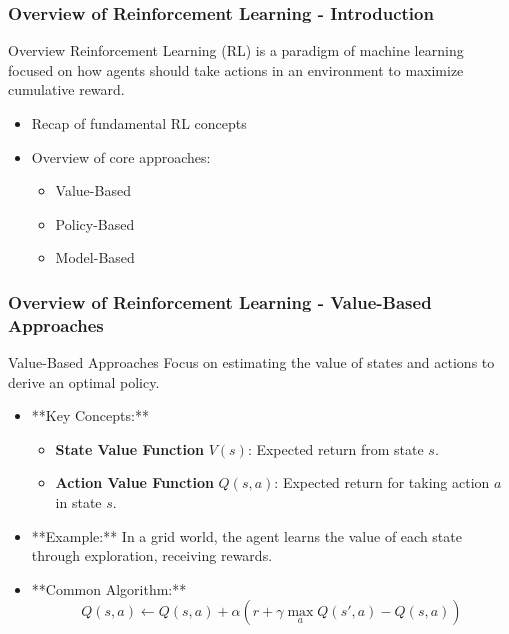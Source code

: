 \documentclass[aspectratio=169]{beamer}
\begin{document}
\begin{frame}[fragile]
    \frametitle{Overview of Reinforcement Learning - Introduction}
    \begin{block}{Overview}
        Reinforcement Learning (RL) is a paradigm of machine learning focused on how agents should take actions in an environment to maximize cumulative reward.
    \end{block}
    \begin{itemize}
        \item Recap of fundamental RL concepts
        \item Overview of core approaches: 
        \begin{itemize}
            \item Value-Based
            \item Policy-Based
            \item Model-Based
        \end{itemize}
    \end{itemize}
\end{frame}

\begin{frame}[fragile]
    \frametitle{Overview of Reinforcement Learning - Value-Based Approaches}
    \begin{block}{Value-Based Approaches}
        Focus on estimating the value of states and actions to derive an optimal policy.
    \end{block}
    \begin{itemize}
        \item **Key Concepts:**
        \begin{itemize}
            \item \textbf{State Value Function} $V(s)$: Expected return from state $s$.
            \item \textbf{Action Value Function} $Q(s, a)$: Expected return for taking action $a$ in state $s$.
        \end{itemize}
        \item **Example:** 
        In a grid world, the agent learns the value of each state through exploration, receiving rewards.
        \item **Common Algorithm:**
        \begin{equation}
            Q(s, a) \leftarrow Q(s, a) + \alpha \left( r + \gamma \max_a Q(s', a) - Q(s, a) \right)
        \end{equation}
    \end{itemize}
\end{frame}
\end{document}
